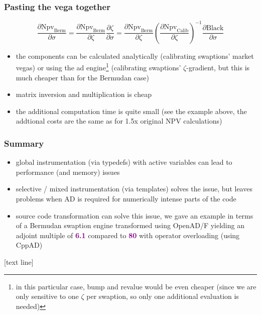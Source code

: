 \documentclass[10pt,German]{beamer}
\begin{document}
\begin{frame}[fragile]
\frametitle{Pasting the vega together}
\begin{equation*}
\frac{\partial \text{Npv}_\text{Berm}}{\partial \sigma} = \frac{\partial \text{Npv}_\text{Berm}}{\partial \zeta} \frac{\partial \zeta}{\partial \sigma} = \frac{\partial \text{Npv}_\text{Berm}}{\partial \zeta} \left( \frac{\partial \text{Npv}_\text{Calib}}{\partial \zeta} \right) ^ {-1} \frac{\partial \text{Black}}{\partial \sigma}
\end{equation*}
\begin{itemize}
\item the components can be calculated analytically (calibrating swaptions' market vegas) or using the ad engine\footnote{in this particular case, bump and revalue would be even cheaper (since we are only sensitive to one $\zeta$ per swaption, so only one additional evaluation is needed)} (calibrating swaptions' $\zeta$-gradient, but this is much cheaper than for the Bermudan case)
\item matrix inversion and multiplication is cheap
\item the additional computation time is quite small (see the example above, the addtional costs are the same as for 1.5x original NPV calculations)
\end{itemize}
\end{frame}

\begin{frame}[fragile]
\frametitle{Summary}
\begin{itemize}
\item global instrumentation (via typedefs) with active variables can lead to performance (and memory) issues
\item selective / mixed instrumentation (via templates) solves the issue, but leaves problems when AD is required for numerically intense parts of the code
\item source code transformation can solve this issue, we gave an example in terms of a Bermudan swaption engine transformed using OpenAD/F yielding an adjoint multiple of \textbf{\textcolor{purple}{6.1}} compared to \textbf{\textcolor{purple}{80}} with operator overloading (using CppAD)
\end{itemize}
\end{frame}

[text line]{}
\end{document}
